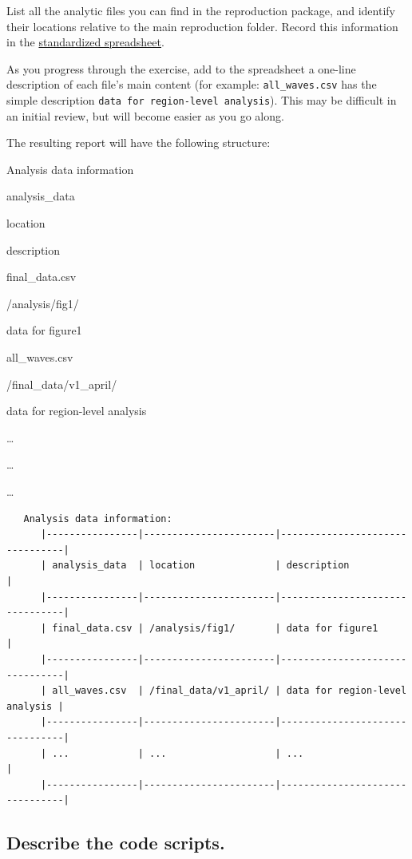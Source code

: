 \documentclass[]{book}
\begin{document}
List all the analytic files you can find in the reproduction package, and identify their locations relative to the main reproduction folder. Record this information in the \href{https://docs.google.com/spreadsheets/d/1LUIdVFH0OfR70C7z07TYeE-uWzKI_JIeWUMaYhqEKK0/edit\#gid=1299317837\&range=A1}{standardized spreadsheet}.

As you progress through the exercise, add to the spreadsheet a one-line description of each file's main content (for example: \texttt{all\_waves.csv} has the simple description \texttt{data\ for\ region-level\ analysis}). This may be difficult in an initial review, but will become easier as you go along.

The resulting report will have the following structure:

\label{tab:analysis-data-information}Analysis data information

analysis\_data

location

description

final\_data.csv

/analysis/fig1/

data for figure1

all\_waves.csv

/final\_data/v1\_april/

data for region-level analysis

\ldots{}

\ldots{}

\ldots{}

\begin{verbatim}
   Analysis data information:
      |----------------|-----------------------|--------------------------------|
      | analysis_data  | location              | description                    |
      |----------------|-----------------------|--------------------------------|
      | final_data.csv | /analysis/fig1/       | data for figure1               |
      |----------------|-----------------------|--------------------------------|
      | all_waves.csv  | /final_data/v1_april/ | data for region-level analysis |
      |----------------|-----------------------|--------------------------------|
      | ...            | ...                   | ...                            |
      |----------------|-----------------------|--------------------------------|
\end{verbatim}

\hypertarget{desc-scripts}{%
\subsection{Describe the code scripts.}\label{desc-scripts}}
\end{document}
